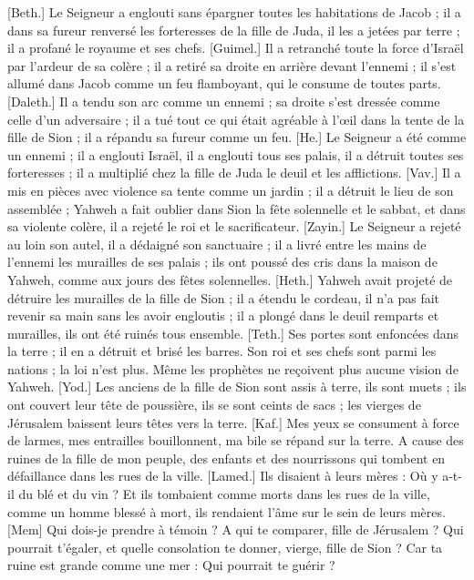 \begin{multicols}{2}
[Beth.] Le Seigneur a englouti sans épargner toutes les habitations de Jacob ; il a dans sa fureur renversé les forteresses de la fille de Juda, il les a jetées par terre ; il a profané le royaume et ses chefs.
[Guimel.] Il a retranché toute la force d’Israël par l’ardeur de sa colère ; il a retiré sa droite en arrière devant l’ennemi ; il s’est allumé dans Jacob comme un feu flamboyant, qui le consume de toutes parts.
[Daleth.] Il a tendu son arc comme un ennemi ; sa droite s'est dressée comme celle d’un adversaire ; il a tué tout ce qui était agréable à l’œil dans la tente de la fille de Sion ; il a répandu sa fureur comme un feu.
[He.] Le Seigneur a été comme un ennemi ; il a englouti Israël, il a englouti tous ses palais, il a détruit toutes ses forteresses ; il a multiplié chez la fille de Juda le deuil et les afflictions.
[Vav.] Il a mis en pièces avec violence sa tente comme un jardin ; il a détruit le lieu de son assemblée ; Yahweh a fait oublier dans Sion la fête solennelle et le sabbat, et dans sa violente colère, il a rejeté le roi et le sacrificateur.
[Zayin.] Le Seigneur a rejeté au loin son autel, il a dédaigné son sanctuaire ; il a livré entre les mains de l’ennemi les murailles de ses palais ; ils ont poussé des cris dans la maison de Yahweh, comme aux jours des fêtes solennelles.
[Heth.] Yahweh avait projeté de détruire les murailles de la fille de Sion ; il a étendu le cordeau, il n’a pas fait revenir sa main sans les avoir engloutis ; il a plongé dans le deuil remparts et murailles, ils ont été ruinés tous ensemble.
[Teth.] Ses portes sont enfoncées dans la terre ; il en a détruit et brisé les barres. Son roi et ses chefs sont parmi les nations ; la loi n’est plus. Même les prophètes ne reçoivent plus aucune vision de Yahweh.
[Yod.] Les anciens de la fille de Sion sont assis à terre, ils sont muets ; ils ont couvert leur tête de poussière, ils se sont ceints de sacs ; les vierges de Jérusalem baissent leurs têtes vers la terre.
[Kaf.] Mes yeux se consument à force de larmes, mes entrailles bouillonnent, ma bile se répand sur la terre. A cause des ruines de la fille de mon peuple, des enfants et des nourrissons qui tombent en défaillance dans les rues de la ville.
[Lamed.] Ils disaient à leurs mères : Où y a-t-il du blé et du vin ? Et ils tombaient comme morts dans les rues de la ville, comme un homme blessé à mort, ils rendaient l'âme sur le sein de leurs mères.
[Mem] Qui dois-je prendre à témoin ? A qui te comparer, fille de Jérusalem ? Qui pourrait t'égaler, et quelle consolation te donner, vierge, fille de Sion ? Car ta ruine est grande comme une mer : Qui pourrait te guérir ?

\end{multicols}
